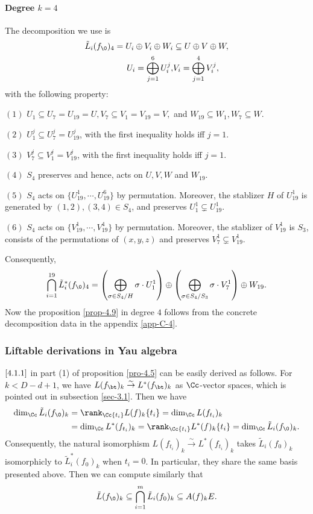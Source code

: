 \paragraph{Degree \texorpdfstring{$k=4$}{k=4}}
The decomposition we use is
\begin{align*}
  \tilde L _i (f_\0)_4= U_i \oplus V_i\oplus W_i&\subseteq U \oplus V\oplus W,\\
  U_i=\bigoplus_{j=1}^6 U_i^j,&
  V_i=\bigoplus_{j=1}^4 V_i^j,
\end{align*}
with the following property:
\begin{fact}
\item[$(1)$] $U_1\subseteq U_7=U_{19}=U, V_7\subseteq V_1=V_{19}=V,$ and $W_{19}\subseteq W_1, W_7 \subseteq W$.
\item[$(2)$] $U_1^j\subseteq U_7^j= U_{19}^j$, with the first inequality holds iff $j=1$. 
\item[$(3)$]$V_7^j\subseteq V_1^j= V_{19}^j$, with the first inequality holds iff $j=1$.
\item[$(4)$] $S_4$ preserves and hence, acts on $U,V,W$ and $W_{19}.$
\item[$(5)$] $S_4$ acts on $\{U_{19}^1,\cdots, U_{19}^6\}$ by permutation. Moreover, the stablizer $H$ of $U_{19}^1$ is generated by $(1,2),(3,4)\in S_4$,  and preserves $U_1^1\subsetneq U_{19}^1$. 
\item[$(6)$] $S_4$ acts on $\{V_{19}^1,\cdots, V_{19}^4\}$ by permutation. Moreover, the stablizer of $V_{19}^1$ is $S_3$, consists of the permutations of $(x,y,z)$ and preserves $V_7^1\subsetneq V_{19}^1$. 
\end{fact}
Consequently, 
\[\bigcap_{i=1}^{19} \tilde L_i^*(f_\0)_4 = \left( \bigoplus_{\sigma \in S_4/H} \sigma\cdot U_1^1\right) \oplus \left( \bigoplus_{\sigma \in S_4/S_3} \sigma\cdot V_7^1\right) \oplus W_{19}. \]
Now the proposition \ref{prop-4.9} in degree $4$ follows from the concrete decomposition data in the appendix \ref{app-C-4}.

\subsubsection{Liftable derivations in Yau algebra}\label{sec-4.2.3}

$\eqref{4.1.1}$ in part (1) of proposition \ref{pro-4.5} can be easily derived as follows. For $k<D-d+1$, we have $L(f_{\bt})_k\stackrel \sim \to L^*(f_\bt)_k$ as $\Cc$-vector spaces, which is pointed out in subsection \ref{sec-3.1}. Then we have
\begin{align*}
  \dim_\Cc \tilde L_i(f_\0)_k &= \rank_{\Cc\{t_i\}} L(f)_k\{t_i\} = \dim_\Cc L(f_{t_i})_k\\
                              &=\dim_\Cc L^*(f_{t_i})_k = \rank_{\Cc\{t_i\}} L^*(f)_k\{t_i\} = \dim_\Cc \tilde L_i(f_\0)_k.
\end{align*}
Consequently, the natural isomorphism $L(f_{t_i})_k\stackrel \sim \to L^*(f_{t_i})_k$ takes $\tilde L_i(f_0)_k$ isomorphicly to $\tilde L_i^*(f_0)_k$ when $t_i=0$. In particular,  they share the same basis presented above. Then we can compute similarly that 
\[\tilde L(f_\0)_k \subseteq 
\bigcap_{i=1}^m \tilde L_i (f_0)_k \subseteq A(f)_k E.\]

